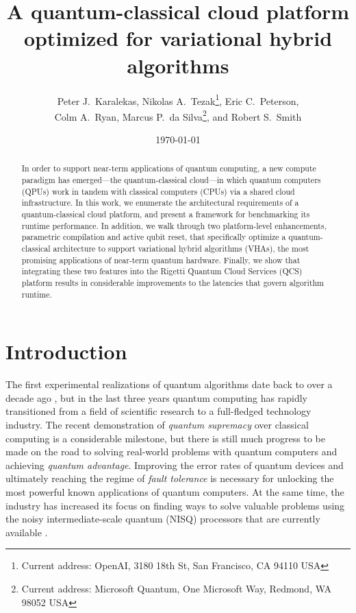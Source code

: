 \documentclass[12pt]{iopart}
\begin{document}
\title{A quantum-classical cloud platform optimized for variational hybrid algorithms}
\author{Peter J.\ Karalekas, Nikolas A.\ Tezak\footnote{Current address: OpenAI, 3180 18th St, San Francisco, CA 94110 USA}, Eric C.\ Peterson,\\Colm A.\ Ryan, Marcus P.\ da Silva\footnote{Current address: Microsoft Quantum, One Microsoft Way, Redmond, WA 98052 USA}, and Robert S.\ Smith}
\address{Rigetti Computing, 2919 Seventh Street, Berkeley, CA 94710 USA}

\date{\today}

\begin{abstract}
In order to support near-term applications of quantum computing, a new compute paradigm has emerged---the quantum-classical cloud---in which quantum computers (QPUs) work in tandem with classical computers (CPUs) via a shared cloud infrastructure. In this work, we enumerate the architectural requirements of a quantum-classical cloud platform,
and present a framework for benchmarking its runtime performance.
In addition, we walk through two platform-level enhancements, parametric compilation and active qubit reset, that specifically optimize a quantum-classical architecture to support variational hybrid algorithms (VHAs), the most promising applications of near-term quantum hardware. Finally, we show that integrating these two features into the Rigetti Quantum Cloud Services (QCS) platform results in considerable improvements to the latencies that govern algorithm runtime.
\end{abstract}

\maketitle

\section{Introduction}

The first experimental realizations of quantum algorithms date back to over a decade ago \cite{IkeNMRProcessor, KwiatOpticsProcessor, GuideIonProcessor, DiCarloSCProcessor}, but in the last three years quantum computing has rapidly transitioned from a field of scientific research to a full-fledged technology industry. The recent demonstration of \textit{quantum supremacy} over classical computing \cite{GoogleSupremacy} is a considerable milestone, but there is still much progress to be made on the road to solving real-world problems with quantum computers and achieving \textit{quantum advantage}. Improving the error rates of quantum devices \cite{Ballance2016, HongEntanglingGate} and ultimately reaching the regime of \textit{fault tolerance} \cite{PreskillSupremacy} is necessary for unlocking the most powerful known applications of quantum computers. At the same time, the industry has increased its focus on finding ways to solve valuable problems using the noisy intermediate-scale quantum (NISQ) processors that are currently available \cite{PreskillNISQ}. 
\end{document}
